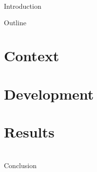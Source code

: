 \documentclass[handout]{beamer}
\begin{document}
    \begin{frame}
        \titlepage
    \end{frame}

    \begin{frame}{Introduction}

    \end{frame}

    \begin{frame}{Outline}
        \tableofcontents[pausesections]
    \end{frame}

    \section{Context}
    \section{Development}
    \section{Results}
    \frame{}
        \section{}
    \begin{frame}{Conclusion}

    \end{frame}
\end{document}
